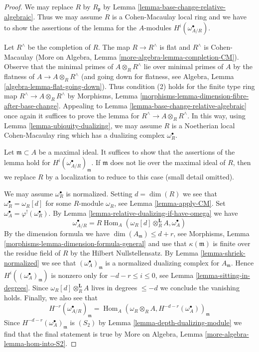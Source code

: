 \documentclass{stacks-project}
\theoremstyle{plain}
\theoremstyle{definition}
\theoremstyle{remark}
\numberwithin{equation}{subsection}
\def\Hom{\mathop{\mathrm{Hom}}\nolimits}
\begin{document}
\begin{proof}
We may replace $R$ by $R_\mathfrak p$ by
Lemma \ref{lemma-base-change-relative-algebraic}.
Thus we may assume $R$ is a Cohen-Macaulay local ring
and we have to show the assertions of the lemma
for the $A$-modules $H^i(\omega_{A/R}^\bullet)$.

\medskip\noindent
Let $R^\wedge$ be the completion of $R$.
The map $R \to R^\wedge$ is flat and $R^\wedge$ is Cohen-Macaulay
(More on Algebra, Lemma \ref{more-algebra-lemma-completion-CM}).
Observe that the minimal primes of $A \otimes_R R^\wedge$
lie over minimal primes of $A$ by the flatness of
$A \to A \otimes_R R^\wedge$ (and going down for flatness, see
Algebra, Lemma \ref{algebra-lemma-flat-going-down}).
Thus condition (2) holds for the finite type ring map
$R^\wedge \to A \otimes_R R^\wedge$ by
Morphisms, Lemma \ref{morphisms-lemma-dimension-fibre-after-base-change}.
Appealing to Lemma \ref{lemma-base-change-relative-algebraic}
once again it suffices to prove the lemma for
$R^\wedge \to A \otimes_R R^\wedge$. In this way, using
Lemma \ref{lemma-ubiquity-dualizing},
we may assume $R$ is a Noetherian local
Cohen-Macaulay ring which has a dualizing complex $\omega_R^\bullet$.

\medskip\noindent
Let $\mathfrak m \subset A$ be a maximal ideal.
It suffices to show that the assertions of
the lemma hold for $H^i(\omega_{A/R}^\bullet)_\mathfrak m$.
If $\mathfrak m$ does not lie over the maximal ideal of $R$,
then we replace $R$ by a localization to reduce to this case
(small detail omitted). 

\medskip\noindent
We may assume $\omega_R^\bullet$ is normalized.
Setting $d = \dim(R)$ we see that $\omega_R^\bullet = \omega_R[d]$
for some $R$-module $\omega_R$, see
Lemma \ref{lemma-apply-CM}. Set
$\omega_A^\bullet = \varphi^!(\omega_R^\bullet)$.
By Lemma \ref{lemma-relative-dualizing-if-have-omega} we have
$$
\omega_{A/R}^\bullet =
R\Hom_A(\omega_R[d] \otimes_R^\mathbf{L} A, \omega_A^\bullet)
$$
By the dimension formula we have $\dim(A_\mathfrak m) \leq d + r$, see
Morphisms, Lemma \ref{morphisms-lemma-dimension-formula-general}
and use that $\kappa(\mathfrak m)$ is finite over the residue field of $R$
by the Hilbert Nullstellensatz.
By Lemma \ref{lemma-shriek-normalized}
we see that $(\omega_A^\bullet)_\mathfrak m$
is a normalized dualizing complex for $A_\mathfrak m$.
Hence $H^i((\omega_A^\bullet)_\mathfrak m)$ is nonzero
only for $-d - r \leq i \leq 0$, see
Lemma \ref{lemma-sitting-in-degrees}.
Since $\omega_R[d] \otimes_R^\mathbf{L} A$ lives in
degrees $\leq -d$ we conclude the vanishing holds.
Finally, we also see that
$$
H^{-r}(\omega_{A/R}^\bullet)_\mathfrak m =
\Hom_A(\omega_R \otimes_R A, H^{-d - r}(\omega_A^\bullet))_\mathfrak m
$$
Since $H^{-d - r}(\omega_A^\bullet)_\mathfrak m$ is $(S_2)$ by
Lemma \ref{lemma-depth-dualizing-module}
we find that the final statement is true by
More on Algebra, Lemma \ref{more-algebra-lemma-hom-into-S2}.
\end{proof}
\end{document}
